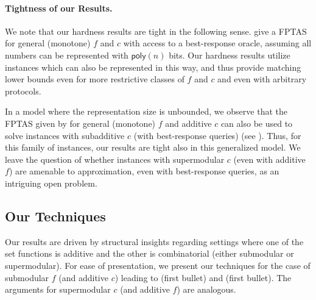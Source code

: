 \documentclass[11pt]{article}
\begin{document}
\paragraph{Tightness of our Results.} 
We note that our hardness results are tight in the following sense. \cite{dutting2022combinatorial} give a FPTAS for general (monotone) $f$ and $c$ with access to a best-response oracle, assuming all numbers can be represented with $\textsf{poly}(n)$ bits. Our hardness results utilize instances which can also be represented in this way, and thus provide matching lower bounds even for more restrictive classes of $f$ and $c$ and even with arbitrary protocols.

In a model where the representation size is unbounded, we observe that the FPTAS given by \cite{multimulti} for general (monotone) $f$ and additive $c$ can also be used to solve instances with subadditive $c$ (with best-response queries) (see ). 
Thus, for this family of instances, our results are tight also in this generalized model.
We leave the question of whether instances with supermodular $c$ (even with additive $f$) are amenable to approximation, even with best-response queries, as an intriguing open problem.

\subsection{Our Techniques}
\label{sec:techniques}
Our results are driven by structural insights regarding settings where one of the set functions is additive and the other is combinatorial (either submodular or supermodular). 
For ease of presentation, we present our techniques for the case of submodular $f$ (and additive $c$) leading to  (first bullet) and  (first bullet). The arguments for supermodular $c$ (and additive $f$) are analogous.
\end{document}
